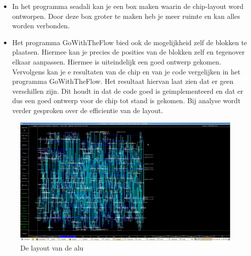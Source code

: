 \begin{itemize} \item
In het programma seadali kan je een box maken waarin de chip-layout word ontworpen. Door deze box groter  te maken heb je meer ruimte en kan alles worden verbonden.
\item Het programma GoWithTheFlow bied ook de mogelijkheid zelf de blokken te plaatsen. Hiermee kan je precies de posities van de blokken zelf en tegenover elkaar aanpassen. Hiermee is uiteindelijk een goed ontwerp gekomen. Vervolgens kan je e resultaten van de chip en van je code vergelijken in het programma GoWithTheFlow. Het resultaat hiervan laat zien dat er geen verschillen zijn. Dit houdt in dat de code goed is geimplementeerd en dat er dus een goed ontwerp voor de chip tot stand is gekomen. Bij analyse wordt verder gesproken over de efficientie van de layout. 
\end{itemize}
\begin{figure} [h!]
\includegraphics [width=\linewidth]{figures/lay-out}
\caption{De layout van de alu}
\label{a}
\end{figure}


